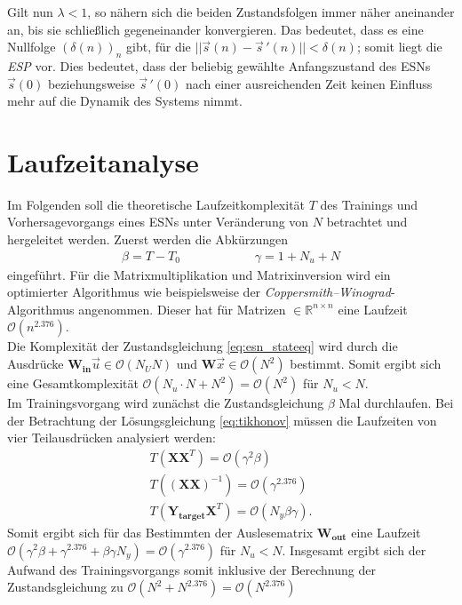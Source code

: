 Gilt nun $\lambda < 1$, so nähern sich die beiden Zustandsfolgen immer näher aneinander an, bis sie schließlich gegeneinander konvergieren. Das bedeutet, dass es eine Nullfolge $(\delta(n))_n$ gibt, für die $||\vec{s}(n) - \vec{s}\,'(n)|| < \delta(n)$; somit liegt die \textit{ESP} vor. Dies bedeutet, dass der beliebig gewählte Anfangszustand des \textsc{ESN}s $\vec{s}(0)$ beziehungsweise $\vec{s}\,'(0)$ nach einer ausreichenden Zeit keinen Einfluss mehr auf die Dynamik des Systems nimmt.

\section{Laufzeitanalyse}
\label{sc:apx_runtime_complexity}
Im Folgenden soll die theoretische Laufzeitkomplexität $T$ des Trainings und Vorhersagevorgangs eines \textsc{ESN}s unter Veränderung von $N$ betrachtet und hergeleitet werden.
Zuerst werden die Abkürzungen
\begin{align*}
\beta = T-T_{0} \qquad\qquad\qquad \gamma = 1+N_u+N
\end{align*}
eingeführt. Für die Matrixmultiplikation und Matrixinversion wird ein optimierter Algorithmus wie beispielsweise der \textit{Coppersmith–Winograd}-Algorithmus angenommen. Dieser hat für Matrizen $\in \mathbb{R}^{n \times n}$ eine Laufzeit $\mathcal{O}(n^{2.376})$. \\
Die Komplexität der Zustandsgleichung \ref{eq:esn_stateeq} wird durch die Ausdrücke $\mathbf{W_{in}} \vec{u} \in \mathcal{O}(N_U N)$ und $\mathbf{W}\vec{x} \in \mathcal{O}(N^2)$ bestimmt. Somit ergibt sich eine Gesamtkomplexität $\mathcal{O}(N_u \cdot N + N^2) = \mathcal{O}(N^2)$ für $N_u < N$.\\

Im Trainingsvorgang wird zunächst die Zustandsgleichung $\beta$ Mal durchlaufen. Bei der Betrachtung der Lösungsgleichung \ref{eq:tikhonov} müssen die Laufzeiten von vier Teilausdrücken analysiert werden:
\begin{align*}
T\left(\mathbf{X}\mathbf{X}^T \right) = \mathcal{O}(\gamma^2 \beta) \\
T\left((\mathbf{X}\mathbf{X})^{-1} \right) = \mathcal{O}(\gamma^{2.376}) \\
T\left(\mathbf{Y_{target}}\mathbf{X}^T \right) = \mathcal{O}(N_y \beta \gamma).
\end{align*}
Somit ergibt sich für das Bestimmten der Auslesematrix $\mathbf{W_{out}}$ eine Laufzeit $\mathcal{O}(\gamma^2 \beta + \gamma^{2.376} + \beta \gamma N_y) = \mathcal{O}(\gamma^{2.376})$  für $N_u < N$.
Insgesamt ergibt sich der Aufwand des Trainingsvorgangs somit inklusive der Berechnung der Zustandsgleichung zu $\mathcal{O}(N^2 + N^{2.376}) = \mathcal{O}(N^{2.376})$\\

